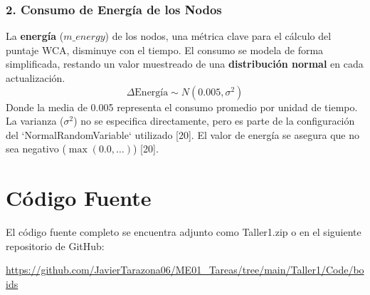 \documentclass{article}
\begin{document}
\subsubsection*{2. Consumo de Energía de los Nodos}
La \textbf{energía} ($m\_energy$) de los nodos, una métrica clave para el cálculo del puntaje WCA, disminuye con el tiempo. El consumo se modela de forma simplificada, restando un valor muestreado de una \textbf{distribución normal} en cada actualización.
\begin{equation*}
    \Delta \text{Energía} \sim N(0.005, \sigma^2)
\end{equation*}
Donde la media de 0.005 representa el consumo promedio por unidad de tiempo. La varianza ($\sigma^2$) no se especifica directamente, pero es parte de la configuración del `NormalRandomVariable` utilizado [20]. El valor de energía se asegura que no sea negativo ($\max(0.0, \dots)$) [20].


\section{Código Fuente}\label{sec:cod}

El código fuente completo se encuentra adjunto como Taller1.zip
o en el siguiente repositorio de GitHub:

\begin{center}
\url{https://github.com/JavierTarazona06/ME01_Tareas/tree/main/Taller1/Code/boids}
\end{center}
\end{document}
